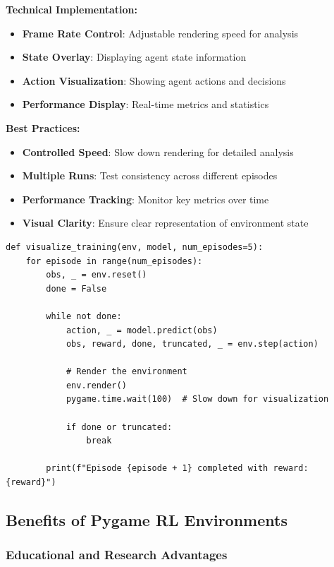 \documentclass[12pt]{article}
\begin{document}
{{{\textbf{Technical Implementation:}
\begin{itemize}
    \item \textbf{Frame Rate Control}: Adjustable rendering speed for analysis
    \item \textbf{State Overlay}: Displaying agent state information
    \item \textbf{Action Visualization}: Showing agent actions and decisions
    \item \textbf{Performance Display}: Real-time metrics and statistics
\end{itemize}

\textbf{Best Practices:}
\begin{itemize}
    \item \textbf{Controlled Speed}: Slow down rendering for detailed analysis
    \item \textbf{Multiple Runs}: Test consistency across different episodes
    \item \textbf{Performance Tracking}: Monitor key metrics over time
    \item \textbf{Visual Clarity}: Ensure clear representation of environment state
\end{itemize}

\begin{verbatim}
def visualize_training(env, model, num_episodes=5):
    for episode in range(num_episodes):
        obs, _ = env.reset()
        done = False
        
        while not done:
            action, _ = model.predict(obs)
            obs, reward, done, truncated, _ = env.step(action)
            
            # Render the environment
            env.render()
            pygame.time.wait(100)  # Slow down for visualization
            
            if done or truncated:
                break
                
        print(f"Episode {episode + 1} completed with reward: {reward}")
\end{verbatim}

\subsection{Benefits of Pygame RL Environments}

\subsubsection{Educational and Research Advantages}

}}}
\end{document}
